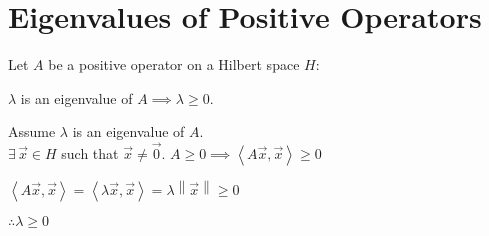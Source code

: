 \documentclass[letterpaper,12pt,fleqn]{article}
\renewcommand{\l}{\lambda}
\newcommand{\norm}[1]{\left\|#1\right\|}
\newcommand{\inner}[1]{\left<#1\right>}
\newcommand{\vx}{\vec{x}}
\newcommand{\vo}{\vec{0}}
\begin{document}
\section*{Eigenvalues of Positive Operators}

\begin{theorem}
  Let $A$ be a positive operator on a Hilbert space $H$:

  \qquad$\l$ is an eigenvalue of $A\implies\l\ge0$.
\end{theorem}

\begin{theproof}
  Assume $\l$ is an eigenvalue of $A$. \\
  $\exists\,\vx\in H$ such that $\vx\ne\vo$.
  $A\ge0\implies\inner{A\vx,\vx}\ge0$
  
  $\inner{A\vx,\vx}=\inner{\l\vx,\vx}=\l\norm{\vx}\ge0$

  $\therefore\l\ge0$
\end{theproof}
\end{document}
